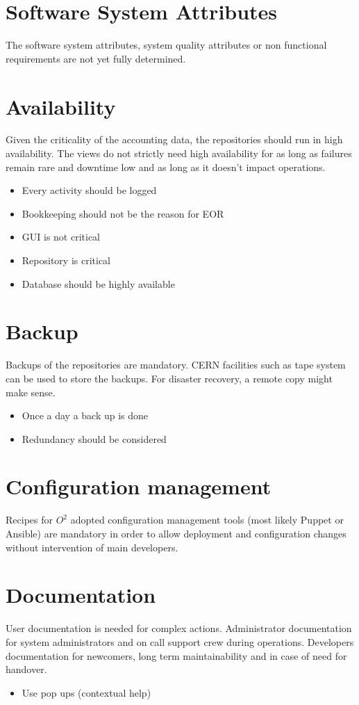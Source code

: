 \section{Software System Attributes}
The software system attributes, system quality attributes or non functional requirements are not yet fully determined. 




\section{Availability}
Given the criticality of the accounting data, the repositories should run in high availability. The views do not strictly need high availability for as long as failures remain rare and downtime low and as long as it doesn’t impact operations.

\begin{itemize}
  \item Every activity should be logged
  \item Bookkeeping should not be the reason for EOR
  \item GUI is not critical
  \item Repository is critical
  \item Database should be highly available
\end{itemize}


\section{Backup}
Backups of the repositories are mandatory. CERN facilities such as tape system can be used to store the backups. For disaster recovery, a remote copy might make sense. 
\begin{itemize}
  \item Once a day a back up is done
  \item Redundancy should be considered
\end{itemize}

\section{Configuration management}
Recipes for $O^2$ adopted configuration management tools (most likely Puppet or Ansible) are mandatory in order to allow deployment and configuration changes without intervention of main developers. 

\section{Documentation}
User documentation is needed for complex actions. Administrator documentation for system administrators and on call support crew during operations. Developers documentation for newcomers, long term maintainability and in case of need for handover. 
\begin{itemize}
  \item Use pop ups (contextual help)
\end{itemize}

